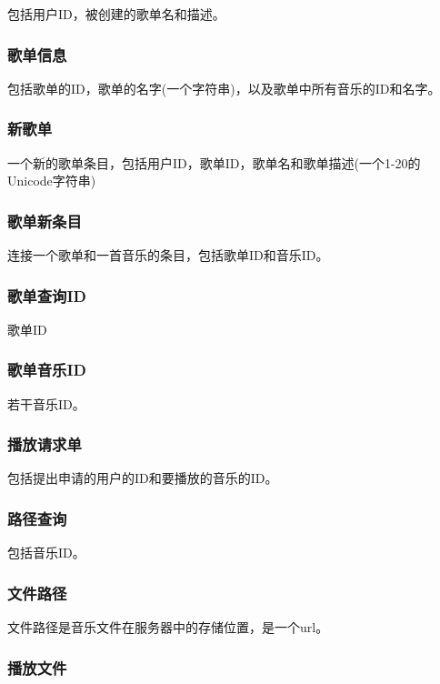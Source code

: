 包括用户ID，被创建的歌单名和描述。

\subsubsection{歌单信息}

包括歌单的ID，歌单的名字(一个字符串)，以及歌单中所有音乐的ID和名字。

\subsubsection{新歌单}

一个新的歌单条目，包括用户ID，歌单ID，歌单名和歌单描述(一个1-20的Unicode字符串)

\subsubsection{歌单新条目}

连接一个歌单和一首音乐的条目，包括歌单ID和音乐ID。

\subsubsection{歌单查询ID}

歌单ID

\subsubsection{歌单音乐ID}

若干音乐ID。

\subsubsection{播放请求单}

包括提出申请的用户的ID和要播放的音乐的ID。


\subsubsection{路径查询}

包括音乐ID。

\subsubsection{文件路径}

文件路径是音乐文件在服务器中的存储位置，是一个url。

\subsubsection{播放文件}

